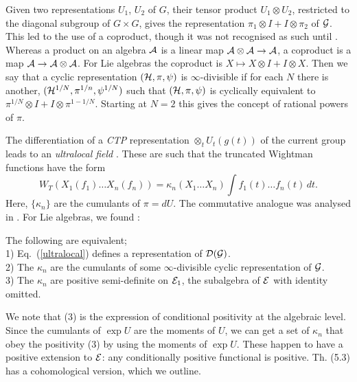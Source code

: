 Given two representations $U_1$, $U_2$ of $G$, their tensor product
$U_1\otimes U_2$, restricted to the diagonal subgroup of $G\times G$, gives
the representation $\pi_1\otimes I+I\otimes\pi_2$ of ${\cal G}$. This led to
the use of a coproduct, though it was not recognised as such until
\cite{Schurmann}. Whereas a product on an algebra ${\cal A}$ is a linear
map ${\cal A}\otimes{\cal A}\rightarrow{\cal A}$, a coproduct is a map
${\cal A}\rightarrow{\cal A}\otimes{\cal A}$.
For Lie algebras the coproduct is $X\mapsto X\otimes I
+I\otimes X$. Then we say that a cyclic representation $({\cal H},\pi,\psi)$
is $\infty$-divisible if for each $N$ there is another, $({\cal H}^{1/N},
\pi^{1/n},\psi^{1/N})$ such that $({\cal H},\pi,\psi)$ is cyclically equivalent
to $\pi^{1/N}\otimes I+I\otimes\pi^{1-1/N}$. Starting at $N=2$ this gives
the concept of rational powers of $\pi$.

The differentiation of a {\em CTP} representation $\otimes_t
U_t(g(t))$ of the
current group leads to an {\em ultralocal field} \cite{Arakithesis,Klauder}. These are
such that the truncated Wightman functions have the form
\begin{equation}
W_T(X_1(f_1)\ldots X_n(f_n))=\kappa_n(X_1\ldots X_n)\int f_1(t)\ldots
f_n(t)\,dt.
\label{ultralocal}
\end{equation}
Here, $\{\kappa_n\}$ are the cumulants of $\pi=dU$. The commutative analogue
was analysed in \cite{GelfandV}. For Lie algebras, we found \cite{RFS4}:
\begin{theorem}
The following are equivalent;\\
1) Eq.~(\ref{ultralocal}) defines a representation of ${\cal D}({\cal G})$.\\
2) The $\kappa_n$ are the cumulants of some $\infty$-divisible cyclic
representation of ${\cal G}$.\\
3) The $\kappa_n$ are positive semi-definite on ${\cal E}_1$,
the subalgebra of ${\cal E}$ with identity omitted.
\end{theorem}
We note that (3) is the expression of conditional positivity at the
algebraic level.
Since the cumulants of $\exp U$ are the moments of $U$, we can get a set of
$\kappa_n$ that obey the positivity (3) by using the moments of $\exp U$.
These happen to have a positive extension to ${\cal E}$: any
conditionally positive functional is positive. Th. (5.3) has a cohomological
version, which we outline.

